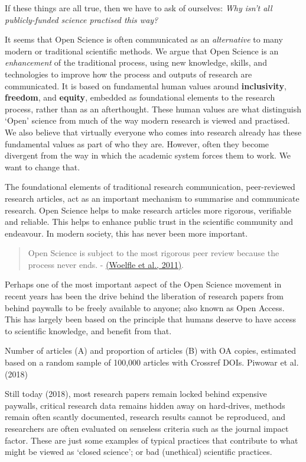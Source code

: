 \documentclass[]{book}
\begin{document}
If these things are all true, then we have to ask of ourselves: \emph{Why isn't all publicly-funded science practised this way?}

It seems that Open Science is often communicated as an \emph{alternative} to many modern or traditional scientific methods. We argue that Open Science is an \emph{enhancement} of the traditional process, using new knowledge, skills, and technologies to improve how the process and outputs of research are communicated. It is based on fundamental human values around \textbf{inclusivity}, \textbf{freedom}, and \textbf{equity}, embedded as foundational elements to the research process, rather than as an afterthought. These human values are what distinguish `Open' science from much of the way modern research is viewed and practised. We also believe that virtually everyone who comes into research already has these fundamental values as part of who they are. However, often they become divergent from the way in which the academic system forces them to work. We want to change that.

The foundational elements of traditional research communication, peer-reviewed research articles, act as an important mechanism to summarise and communicate research. Open Science helps to make research articles more rigorous, verifiable and reliable. This helps to enhance public trust in the scientific community and endeavour. In modern society, this has never been more important.

\begin{quote}
Open Science is subject to the most rigorous peer review because the process never ends. - \href{https://github.com/OpenScienceMOOC/Module-1-Open-Principles/blob/master/Reading\%20Material_Open\%20Principles/Woelfle\%20et\%20al.\%2C\%202011.pdf}{(Woelfle et al., 2011)}.
\end{quote}

Perhaps one of the most important aspect of the Open Science movement in recent years has been the drive behind the liberation of research papers from behind paywalls to be freely available to anyone; also known as Open Access. This has largely been based on the principle that humans deserve to have access to scientific knowledge, and benefit from that.

Number of articles (A) and proportion of articles (B) with OA copies, estimated based on a random sample of 100,000 articles with Crossref DOIs. Piwowar et al. (2018)

Still today (2018), most research papers remain locked behind expensive paywalls, critical research data remains hidden away on hard-drives, methods remain often scantly documented, research results cannot be reproduced, and researchers are often evaluated on senseless criteria such as the journal impact factor. These are just some examples of typical practices that contribute to what might be viewed as `closed science'; or bad (unethical) scientific practices.
\end{document}

